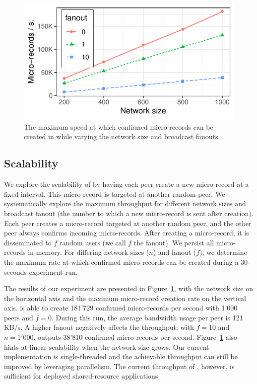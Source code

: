 \begin{figure}[t]
	\centering
	\includegraphics[width=\linewidth]{trustchain/assets/scalability}
	\caption{The maximum speed at which confirmed micro-records can be created in \ModelName{} while varying the network size and broadcast fanouts.}
	\label{fig:scalability}
\end{figure}

\subsection{Scalability}
We explore the scalability of \ModelName{} by having each peer create a new micro-record at a fixed interval.
This micro-record is targeted at another random peer.
We systematically explore the maximum throughput for different network sizes and broadcast fanout (the number to which a new micro-record is sent after creation).
Each peer creates a micro-record targeted at another random peer, and the other peer always confirms incoming micro-records.
After creating a micro-record, it is disseminated to $ f $ random users (we call $ f $ the fanout).
We persist all micro-records in memory.
For differing network sizes ($ n $) and fanout ($ f $), we determine the maximum rate at which confirmed micro-records can be created during a 30-seconds experiment run.

The results of our experiment are presented in Figure~\ref{fig:scalability}, with the network size on the horizontal axis and the maximum micro-record creation rate on the vertical axis.
\ModelName{} is able to create 181'729 confirmed micro-records per second with 1'000 peers and $ f = 0 $.
During this run, the average bandwidth usage per peer is 121 KB/s.
A higher fanout negatively affects the throughput: with $ f = 10 $ and $ n = 1'000 $, \ModelName{} outputs 38'810 confirmed micro-records per second.
Figure~\ref{fig:scalability} also hints at linear scalability when the network size grows.
Our current implementation is single-threaded and the achievable throughput can still be improved by leveraging parallelism.
The current throughput of \ModelName{}, however, is sufficient for deployed shared-resource applications.

